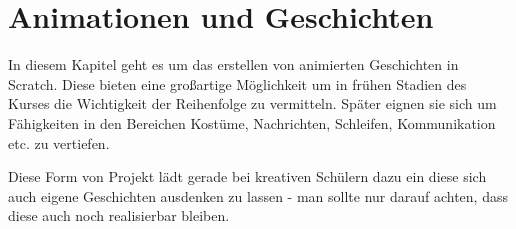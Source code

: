 \chapter {Animationen und Geschichten}

In diesem Kapitel geht es um das erstellen von animierten Geschichten in Scratch. Diese bieten eine großartige Möglichkeit um in frühen Stadien des Kurses die Wichtigkeit der Reihenfolge zu vermitteln. Später eignen sie sich um Fähigkeiten in den Bereichen Kostüme, Nachrichten, Schleifen, Kommunikation etc. zu vertiefen.

Diese Form von Projekt lädt gerade bei kreativen Schülern dazu ein diese sich auch eigene Geschichten ausdenken zu lassen - man sollte nur darauf achten, dass diese auch noch realisierbar bleiben.



